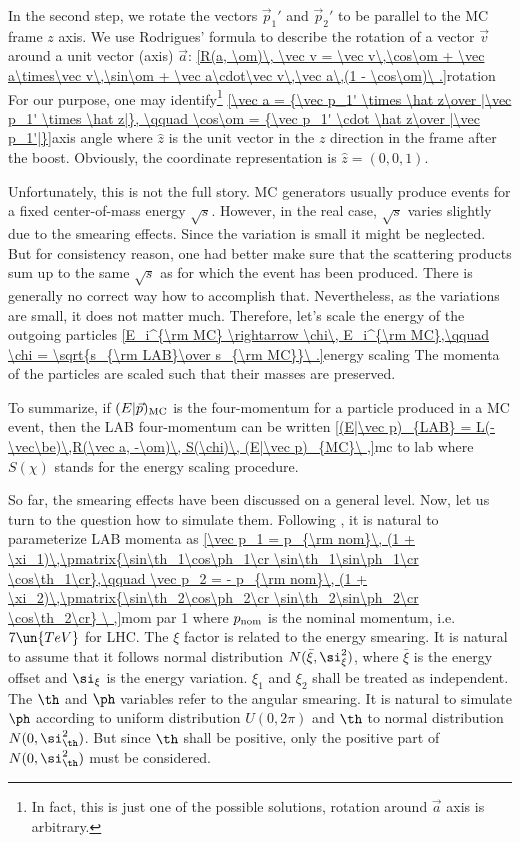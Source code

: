 In the second step, we rotate the vectors $\vec p_1'$ and $\vec p_2'$ to be parallel to the MC frame $z$ axis. We use Rodrigues' formula to describe the rotation of a vector $\vec v$ around a unit vector (axis) $\vec a$:
\eqref{R(a, \om)\, \vec v = \vec v\,\cos\om + \vec a\times\vec v\,\sin\om + \vec a\cdot\vec v\,\vec a\,(1 - \cos\om)\ .}{rotation}
For our purpose, one may identify\footnote{In fact, this is just one of the possible solutions, rotation around $\vec a$ axis is arbitrary.}
\eqref{\vec a = {\vec p_1' \times \hat z\over |\vec p_1' \times \hat z|}, \qquad \cos\om = {\vec p_1' \cdot \hat z\over |\vec p_1'|}}{axis angle}
where $\hat z$ is the unit vector in the $z$ direction in the frame after the boost. Obviously, the coordinate representation is $\hat z = (0, 0, 1)$.

Unfortunately, this is not the full story. MC generators usually produce events for a fixed center-of-mass energy $\sqrt{s}$. However, in the real case, $\sqrt{s}$ varies slightly due to the smearing effects. Since the variation is small it might be neglected. But for consistency reason, one had better make sure that the scattering products sum up to the same $\sqrt{s}$ as for which the event has been produced. There is generally no correct way how to accomplish that. Nevertheless, as the variations are small, it does not matter much. Therefore, let's scale the energy of the outgoing particles
\eqref{E_i^{\rm MC} \rightarrow \chi\, E_i^{\rm MC},\qquad \chi = \sqrt{s_{\rm LAB}\over s_{\rm MC}}\ .}{energy scaling}
The momenta of the particles are scaled such that their masses are preserved.

To summarize, if $(E|\vec p)_{\rm MC}$ is the four-momentum for a particle produced in a MC event, then the LAB four-momentum can be written
\eqref{(E|\vec p)_{LAB} = L(-\vec\be)\,R(\vec a, -\om)\, S(\chi)\, (E|\vec p)_{MC}\ ,}{mc to lab}
where $S(\chi)$ stands for the energy scaling procedure.



So far, the smearing effects have been discussed on a general level. Now, let us turn to the question how to simulate them. Following , it is natural to parameterize LAB momenta as
\eqref{\vec p_1 = p_{\rm nom}\, (1 + \xi_1)\,\pmatrix{\sin\th_1\cos\ph_1\cr \sin\th_1\sin\ph_1\cr \cos\th_1\cr},\qquad \vec p_2 = - p_{\rm nom}\, (1 + \xi_2)\,\pmatrix{\sin\th_2\cos\ph_2\cr \sin\th_2\sin\ph_2\cr \cos\th_2\cr} \ ,}{mom par 1}
where $p_{\rm nom}$ is the nominal momentum, i.e. $7\un{TeV}$ for LHC. The $\xi$ factor is related to the energy smearing. It is natural to assume that it follows normal distribution $N(\bar\xi, \si_\xi^2)$, where $\bar\xi$ is the energy offset and $\si_\xi$ is the energy variation. $\xi_1$ and $\xi_2$ shall be treated as independent. The $\th$ and $\ph$ variables refer to the angular smearing. It is natural to simulate $\ph$ according to uniform distribution $U(0, 2\pi)$ and $\th$ to normal distribution $N(0, \si_\th^2)$. But since $\th$ shall be positive, only the positive part of $N(0, \si_\th^2)$ must be considered. 

